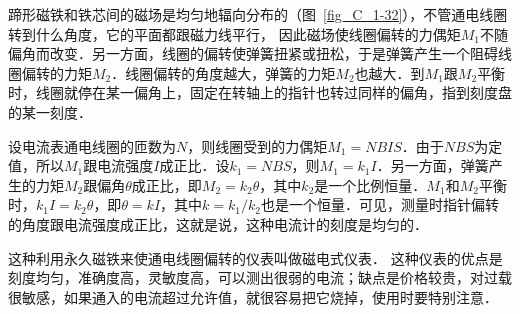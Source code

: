 蹄形磁铁和铁芯间的磁场是均匀地辐向分布的（图~\ref{fig_C_1-32}），不管通电线圈转到什么角度，它的平面都跟磁力线平行，
因此磁场使线圈偏转的力偶矩$M_1$不随偏角而改变．另一方面，线圈的偏转使弹簧扭紧或扭松，于是弹簧产生一个阻碍线圈偏转的力矩$M_2$．线圈偏转的角度越大，弹簧的力矩$M_2$也越大．到$M_1$跟$M_2$平衡时，线圈就停在某一偏角上，固定在转轴上的指针也转过同样的偏角，指到刻度盘的某一刻度．

设电流表通电线圈的匝数为$N$，则线圈受到的力偶矩$M_1=NBIS$．由于$NBS$为定值，所以$M_1$跟电流强度$I$成正比．设$k_1=NBS$，则$M_1=k_1I$．另一方面，弹簧产生的力矩$M_2$跟偏角$\theta$成正比，即$M_2=k_2\theta$，其中$k_2$是一个比例恒量．$M_1$和$M_2$平衡时，$k_1I=k_2\theta$，即$\theta =kI$，其中$k=k_1/k_2$也是一个恒量．可见，测量时指针偏转的角度跟电流强度成正比，这就是说，这种电流计的刻度是均匀的．

这种利用永久磁铁来使通电线圈偏转的仪表叫做磁电式仪表．
这种仪表的优点是刻度均匀，准确度高，灵敏度高，可以测出很弱的电流；缺点是价格较贵，对过载很敏感，如果通入的电流超过允许值，就很容易把它烧掉，使用时要特别注意．

